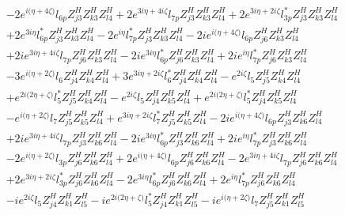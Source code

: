 \begin{align}
 &-2 e^{i \Big(\eta +4 \zeta \Big)} l_{6p} Z_{{j 3}}^{H} Z_{{k 3}}^{H} Z_{{l 4}}^{H} +2 e^{3 i \eta +4 i \zeta } l_{7p} Z_{{j 3}}^{H} Z_{{k 3}}^{H} Z_{{l 4}}^{H} +2 e^{3 i \eta +2 i \zeta } l_{3p}^* Z_{{j 3}}^{H} Z_{{k 3}}^{H} Z_{{l 4}}^{H} \nonumber \\ 
 &+2 e^{3 i \eta } l_{6p}^* Z_{{j 3}}^{H} Z_{{k 3}}^{H} Z_{{l 4}}^{H} -2 e^{i \eta } l_{7p}^* Z_{{j 3}}^{H} Z_{{k 3}}^{H} Z_{{l 4}}^{H} -2 i e^{i \Big(\eta +4 \zeta \Big)} l_{6p} Z_{{j 6}}^{H} Z_{{k 3}}^{H} Z_{{l 4}}^{H} \nonumber \\ 
 &+2 i e^{3 i \eta +4 i \zeta } l_{7p} Z_{{j 6}}^{H} Z_{{k 3}}^{H} Z_{{l 4}}^{H} -2 i e^{3 i \eta } l_{6p}^* Z_{{j 6}}^{H} Z_{{k 3}}^{H} Z_{{l 4}}^{H} +2 i e^{i \eta } l_{7p}^* Z_{{j 6}}^{H} Z_{{k 3}}^{H} Z_{{l 4}}^{H} \nonumber \\ 
 &-3 e^{i \Big(\eta +2 \zeta \Big)} l_6 Z_{{j 4}}^{H} Z_{{k 4}}^{H} Z_{{l 4}}^{H} +3 e^{3 i \eta +2 i \zeta } l_6^* Z_{{j 4}}^{H} Z_{{k 4}}^{H} Z_{{l 4}}^{H} - e^{2 i \zeta } l_5 Z_{{j 5}}^{H} Z_{{k 4}}^{H} Z_{{l 4}}^{H} \nonumber \\ 
 &+e^{2 i \Big(2 \eta +\zeta \Big)} l_5^* Z_{{j 5}}^{H} Z_{{k 4}}^{H} Z_{{l 4}}^{H} - e^{2 i \zeta } l_5 Z_{{j 4}}^{H} Z_{{k 5}}^{H} Z_{{l 4}}^{H} +e^{2 i \Big(2 \eta +\zeta \Big)} l_5^* Z_{{j 4}}^{H} Z_{{k 5}}^{H} Z_{{l 4}}^{H} \nonumber \\ 
 &- e^{i \Big(\eta +2 \zeta \Big)} l_7 Z_{{j 5}}^{H} Z_{{k 5}}^{H} Z_{{l 4}}^{H} +e^{3 i \eta +2 i \zeta } l_7^* Z_{{j 5}}^{H} Z_{{k 5}}^{H} Z_{{l 4}}^{H} -2 i e^{i \Big(\eta +4 \zeta \Big)} l_{6p} Z_{{j 3}}^{H} Z_{{k 6}}^{H} Z_{{l 4}}^{H} \nonumber \\ 
 &+2 i e^{3 i \eta +4 i \zeta } l_{7p} Z_{{j 3}}^{H} Z_{{k 6}}^{H} Z_{{l 4}}^{H} -2 i e^{3 i \eta } l_{6p}^* Z_{{j 3}}^{H} Z_{{k 6}}^{H} Z_{{l 4}}^{H} +2 i e^{i \eta } l_{7p}^* Z_{{j 3}}^{H} Z_{{k 6}}^{H} Z_{{l 4}}^{H} \nonumber \\ 
 &-2 e^{i \Big(\eta +2 \zeta \Big)} l_{3p} Z_{{j 6}}^{H} Z_{{k 6}}^{H} Z_{{l 4}}^{H} +2 e^{i \Big(\eta +4 \zeta \Big)} l_{6p} Z_{{j 6}}^{H} Z_{{k 6}}^{H} Z_{{l 4}}^{H} -2 e^{3 i \eta +4 i \zeta } l_{7p} Z_{{j 6}}^{H} Z_{{k 6}}^{H} Z_{{l 4}}^{H} \nonumber \\ 
 &+2 e^{3 i \eta +2 i \zeta } l_{3p}^* Z_{{j 6}}^{H} Z_{{k 6}}^{H} Z_{{l 4}}^{H} -2 e^{3 i \eta } l_{6p}^* Z_{{j 6}}^{H} Z_{{k 6}}^{H} Z_{{l 4}}^{H} +2 e^{i \eta } l_{7p}^* Z_{{j 6}}^{H} Z_{{k 6}}^{H} Z_{{l 4}}^{H} \nonumber \\ 
 &-i e^{2 i \zeta } l_5 Z_{{j 4}}^{H} Z_{{k 1}}^{H} Z_{{l 5}}^{H} -i e^{2 i \Big(2 \eta +\zeta \Big)} l_5^* Z_{{j 4}}^{H} Z_{{k 1}}^{H} Z_{{l 5}}^{H} -i e^{i \Big(\eta +2 \zeta \Big)} l_7 Z_{{j 5}}^{H} Z_{{k 1}}^{H} Z_{{l 5}}^{H} \nonumber \\ 

\end{align}

